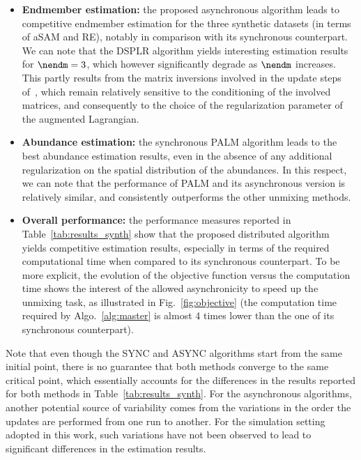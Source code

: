 \documentclass[journal,final,letterpaper,twoside,twocolumn]{IEEEtran}
\begin{document}
\begin{itemize}
    \item \textbf{Endmember estimation:} the proposed asynchronous algorithm leads to competitive endmember estimation for the three synthetic datasets (in terms of aSAM and RE), notably in comparison with its synchronous counterpart. We can note that the DSPLR algorithm yields interesting estimation results for $\nendm = 3$, which however significantly degrade as $\nendm$ increases. This partly results from the matrix inversions involved in the update steps of~\cite{Tsinos2017}, which remain relatively sensitive to the conditioning of the involved matrices, and consequently to the choice of the regularization parameter of the augmented Lagrangian.
    \item \textbf{Abundance estimation:} the synchronous PALM algorithm leads to the best abundance estimation results, even in the absence of any additional regularization on the spatial distribution of the abundances. In this respect, we can note that the performance of PALM and its asynchronous version is relatively similar, and consistently outperforms the other unmixing methods.
    \item \textbf{Overall performance:} the performance measures reported in Table~\ref{tab:results_synth} show that the proposed distributed algorithm yields competitive estimation results, especially in terms of the required computational time when compared to its synchronous counterpart. To be more explicit, the evolution of the objective function versus the computation time shows the interest of the allowed asynchronicity to speed up the unmixing task, as illustrated in Fig.~\ref{fig:objective} (the computation time required by Algo.~\ref{alg:master} is almost 4 times lower than the one of its synchronous counterpart).
\end{itemize}

Note that even though the SYNC and ASYNC algorithms start from the same initial point, there is no guarantee that both methods converge to the same critical point, which essentially accounts for the differences in the results reported for both methods in Table~\ref{tab:results_synth}. For the asynchronous algorithms, another potential source of variability comes from the variations in the order the updates are performed from one run to another. For the simulation setting adopted in this work, such variations have not been observed to lead to significant differences in the estimation results.

\end{document}
